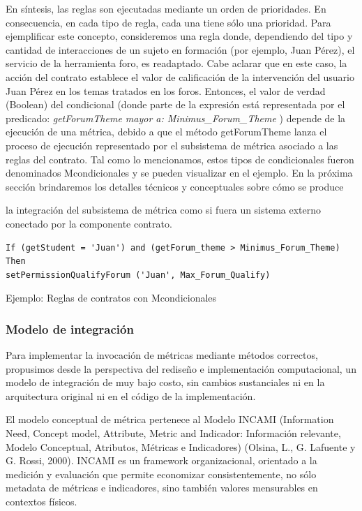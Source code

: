 En síntesis, las reglas son ejecutadas mediante un orden de prioridades. En
consecuencia, en cada tipo de regla, cada una tiene sólo una prioridad.
Para ejemplificar este concepto, consideremos una regla donde, dependiendo
del tipo y cantidad de interacciones de un sujeto en formación (por
ejemplo, Juan Pérez), el servicio de la herramienta foro, es readaptado. Cabe
aclarar que en este caso, la acción del contrato establece el valor de calificación
de la intervención del usuario Juan Pérez en los temas tratados en los
foros. Entonces, el valor de verdad (Boolean) del condicional (donde parte de
la expresión está representada por el predicado: \textit{getForumTheme mayor a:
Minimus\_Forum\_Theme} ) depende de la ejecución de una métrica, debido a
que el método getForumTheme lanza el proceso de ejecución representado por
el subsistema de métrica asociado a las reglas del contrato.
Tal como lo mencionamos, estos tipos de condicionales fueron denominados
Mcondicionales y se pueden visualizar en el ejemplo. En la próxima sección
brindaremos los detalles técnicos y conceptuales sobre cómo se produce

la integración del subsistema de métrica como si fuera un sistema externo
conectado por la componente contrato.


\begin{verbatim}
If (getStudent = 'Juan') and (getForum_theme > Minimus_Forum_Theme)
Then
setPermissionQualifyForum ('Juan', Max_Forum_Qualify)
\end{verbatim} 
\caption {Ejemplo: Reglas de contratos con Mcondicionales}


\subsubsection {Modelo de integración}

Para implementar la invocación de métricas mediante métodos correctos, propusimos
desde la perspectiva del rediseño e implementación computacional,
un modelo de integración de muy bajo costo, sin cambios sustanciales ni en la
arquitectura original ni en el código de la implementación.

El modelo conceptual de métrica pertenece al Modelo INCAMI (Information Need, Concept model, Attribute, Metric and Indicador: Información relevante, Modelo Conceptual, Atributos, Métricas e Indicadores) (Olsina, L., G. Lafuente y G. Rossi, 2000). INCAMI es un framework organizacional, orientado a la medición y evaluación que permite economizar consistentemente, no sólo metadata de métricas e indicadores, sino también valores mensurables en contextos físicos.


